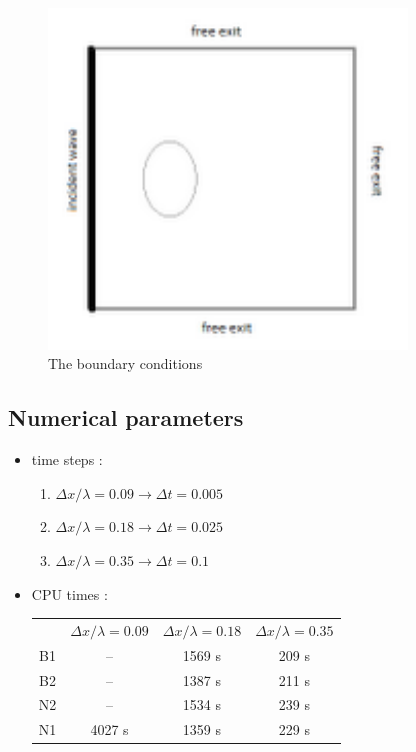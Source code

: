 \begin{figure}[h!]
  \centering
    \includegraphics[width=0.85\textwidth]{boundary_limit.png}
      \caption{The boundary conditions}
\end{figure}

\subsection{Numerical parameters}
\begin{itemize}
\item time steps :
	\begin{enumerate}
    \item $\Delta x / \lambda = 0.09  \rightarrow \Delta t = 0.005 $
    \item $\Delta x / \lambda = 0.18  \rightarrow \Delta t = 0.025 $
    \item $\Delta x / \lambda = 0.35  \rightarrow \Delta t = 0.1 $
  \end{enumerate}
\item CPU times : \\
\begin{tabular}{cccc}
 & $\Delta x / \lambda = 0.09 $ &$\Delta x / \lambda = 0.18 $&$\Delta x / \lambda = 0.35 $\\
 B1 & -- & 1569 s & 209 s \\
 B2 & -- & 1387 s & 211 s \\
 N2 & -- & 1534 s & 239 s \\
 N1 & 4027 s & 1359 s & 229 s\\

\end{tabular}
\end{itemize}

